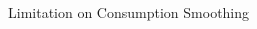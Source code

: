 \documentclass[11pt,aspectratio=43,usenames,dvipsnames]{beamer}
\theoremstyle{definition}
\begin{document}
\begin{frame}{Limitation on Consumption Smoothing}
\begin{columns}
\begin{column}{0.7\textwidth}
{            }
        \end{column}
    \end{columns}

\end{frame}
\end{document}
